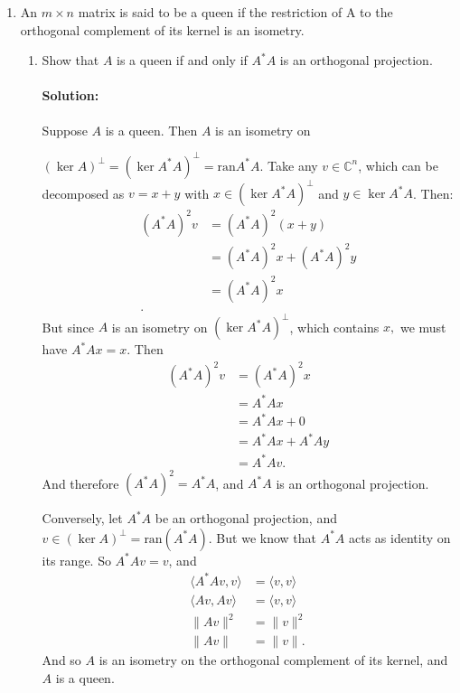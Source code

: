 \documentclass{article}
\begin{document}
\begin{enumerate} 

\item An $m \times n$ matrix is said to be a queen if the restriction of A to the orthogonal complement of its kernel is an isometry.

\begin{enumerate}[label= (\alph*)] 
\item Show that $A$ is a queen if and only if $A^* A$ is an orthogonal projection.
    \paragraph{Solution: }Suppose $A$ is a queen. Then $A$ is an isometry on 

    $(\ker A)^{\perp}=(\ker A^* A)^{\perp}=\text{ran} A^* A$. Take any $v\in \mathbb{C}^{n}$, which can be decomposed as $v=x+y$ with $x\in (\ker A^* A)^\perp$ and $y\in \ker A^* A$. Then:
    \begin{align*}
        (A^* A)^2v&= (A^* A)^2(x+y) \\
            &= (A^* A)^2x +(A^* A)^2y\\
            &= (A^* A)^2x \\
    .\end{align*}
    But since $A$ is an isometry on $(\ker A^* A)^{\perp}$, which contains $x,$ we must have $A^* Ax=x$. Then
    \begin{align*}
        (A^* A)^2v &= (A^* A)^2x \\
        &= A^* Ax \\
        &= A^* Ax +0\\
        &= A^* Ax +A^* Ay\\
        &= A^* Av
    .\end{align*}
    And therefore $(A^* A)^2=A^* A$, and $A^* A$ is an orthogonal projection.

    Conversely, let $A^* A$ be an orthogonal projection, and $v\in (\ker A)^{\perp}=\text{ran}(A^* A)$. But we know that $A^* A$ acts as identity on its range. So $A^* Av=v$, and
    \begin{align*}
       \langle A^* Av,v \rangle&= \langle v,v \rangle \\
       \langle Av,Av \rangle&= \langle v,v \rangle \\
       \|Av\|^2&= \|v\|^2 \\
       \|Av\|&= \|v\|
    .\end{align*}
    And so $A$ is an isometry on the orthogonal complement of its kernel, and $A$ is a queen.


\end{enumerate}
\end{enumerate}
\end{document}
